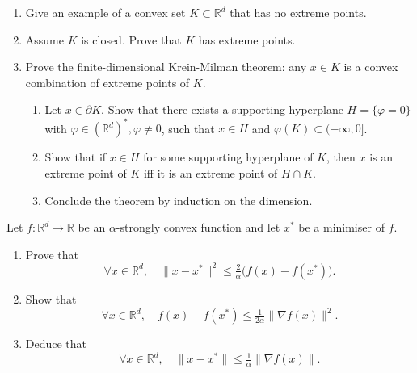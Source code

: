 \begin{exercise}
\begin{enumerate}
  \item Give an example of a convex set $K \subset \mathbb{R}^d$ that has no extreme points.
  \item Assume $K$ is closed. Prove that $K$ has extreme points.
  \item Prove the finite-dimensional Krein-Milman theorem: any $x \in K$ is a convex combination of extreme points of $K$.
  \begin{enumerate}
    \item Let $x \in \partial K$. Show that there exists a supporting hyperplane $H = \{\varphi=0\}$ with $\varphi \in (\mathbb{R}^d)^*, \varphi \neq 0$, such that $x \in H$ and $\varphi(K) \subset (-\infty,0]$.
    \item Show that if $x \in H$ for some supporting hyperplane of $K$, then $x$ is an extreme point of $K$ iff it is an extreme point of $H \cap K$.
    \item Conclude the theorem by induction on the dimension.
  \end{enumerate}
\end{enumerate}
\end{exercise}

\begin{exercise}
Let $f : \mathbb{R}^d \to \mathbb{R}$ be an $\alpha$-strongly convex function and let $x^\ast$ be a minimiser of $f$.
\begin{enumerate}
  \item Prove that
  \[
    \forall x \in \mathbb{R}^d,\quad \|x-x^\ast\|^2 \leq \tfrac{2}{\alpha}\big(f(x)-f(x^\ast)\big).
  \]
  \item Show that
  \[
    \forall x \in \mathbb{R}^d,\quad f(x)-f(x^\ast) \leq \tfrac{1}{2\alpha}\|\nabla f(x)\|^2.
  \]
  \item Deduce that
  \[
    \forall x \in \mathbb{R}^d,\quad \|x-x^\ast\| \leq \tfrac{1}{\alpha}\|\nabla f(x)\|.
  \]
\end{enumerate}
\end{exercise}
